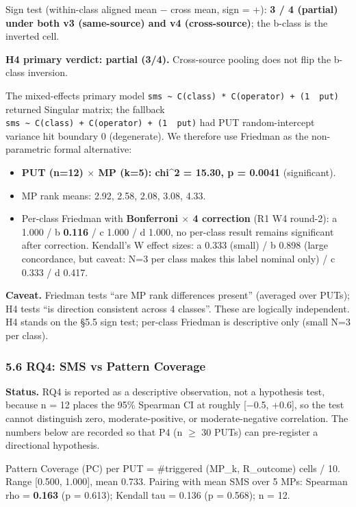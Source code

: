 \documentclass[review,12pt,authoryear]{elsarticle}
\providecommand{\tightlist}{\setlength{\itemsep}{0pt}\setlength{\parskip}{0pt}}
\begin{document}
Sign test (within-class aligned mean − cross mean, sign = +): \textbf{3
/ 4 (partial) under both v3 (same-source) and v4 (cross-source)}; the
b-class is the inverted cell.

\textbf{H4 primary verdict: partial (3/4).} Cross-source pooling does
not flip the b-class inversion.

The mixed-effects primary model
\texttt{sms\ \textasciitilde{}\ C(class)\ *\ C(operator)\ +\ (1\ \textbar{}\ put)}
returned Singular matrix; the fallback
\texttt{sms\ \textasciitilde{}\ C(class)\ +\ C(operator)\ +\ (1\ \textbar{}\ put)}
had PUT random-intercept variance hit boundary 0 (degenerate). We
therefore use Friedman as the non-parametric formal alternative:

\begin{itemize}
\tightlist
\item
  \textbf{PUT (n=12) $\times$ MP (k=5): chi\^{}2 = 15.30, p = 0.0041}
  (significant).
\item
  MP rank means: 2.92, 2.58, 2.08, 3.08, 4.33.
\item
  Per-class Friedman with \textbf{Bonferroni $\times$ 4 correction} (R1 W4
  round-2): a 1.000 / b \textbf{0.116} / c 1.000 / d 1.000, no per-class
  result remains significant after correction. Kendall's W effect sizes:
  a 0.333 (small) / b 0.898 (large concordance, but caveat: N=3 per
  class makes this label nominal only) / c 0.333 / d 0.417.
\end{itemize}

\textbf{Caveat.} Friedman tests ``are MP rank differences present''
(averaged over PUTs); H4 tests ``is direction consistent across 4
classes''. These are logically independent. H4 stands on the §5.5 sign
test; per-class Friedman is descriptive only (small N=3 per class).

\subsubsection{5.6 RQ4: SMS vs Pattern
Coverage}\label{rq4-sms-vs-pattern-coverage}

\textbf{Status.} RQ4 is reported as a descriptive observation, not a
hypothesis test, because n = 12 places the 95\% Spearman CI at roughly
{[}−0.5, +0.6{]}, so the test cannot distinguish zero,
moderate-positive, or moderate-negative correlation. The numbers below
are recorded so that P4 (n $\geq$ 30 PUTs) can pre-register a directional
hypothesis.

Pattern Coverage (PC) per PUT = \#triggered (MP\_k, R\_outcome) cells /
10. Range {[}0.500, 1.000{]}, mean 0.733. Pairing with mean SMS over 5
MPs: Spearman rho = \textbf{0.163} (p = 0.613); Kendall tau = 0.136 (p =
0.568); n = 12.
\end{document}

